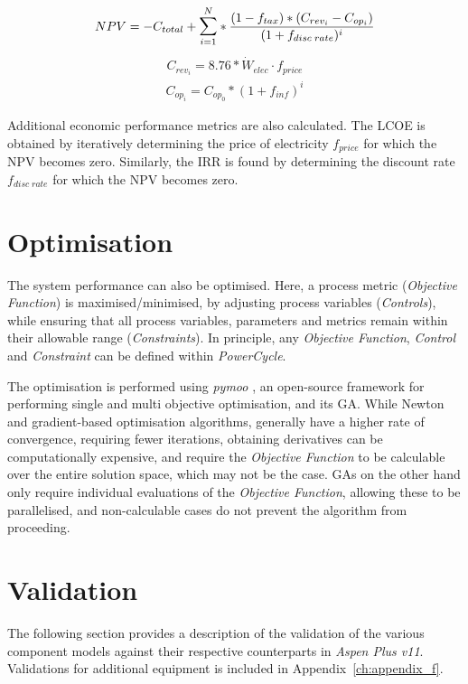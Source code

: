     \begin{align}
        NPV = - C_{total} + \mathlarger{\sum}_{i=1}^N *\frac{(1-f_{tax})*(C_{rev_i} - C_{op_i})}{(1+f_{disc\;rate})^i}\label{eq:economics_NPV}
    \end{align}
    \begin{align}
        C_{rev_i} =  8.76*\Dot W_{elec}\cdot f_{price} \label{eq:economics_revenue}
    \end{align}
    \begin{align}
        C_{op_i} = C_{op_0} *(1+f_{inf})^i \label{eq:economics_opcosts}
    \end{align}

    Additional economic performance metrics are also calculated. The \ac{LCOE} is obtained by iteratively determining the price of electricity \(f_{price}\) for which the \ac{NPV} becomes zero. Similarly, the \ac{IRR} is found by determining the discount rate \(f_{disc\;rate}\) for which the \ac{NPV} becomes zero.

\section{Optimisation}
    The system performance can also be optimised. Here, a process metric (\emph{Objective Function}) is maximised/minimised, by adjusting process variables (\emph{Controls}), while ensuring that all process variables, parameters and metrics remain within their allowable range (\emph{Constraints}). In principle, any \emph{Objective Function}, \emph{Control} and \emph{Constraint} can be defined within \emph{PowerCycle}. 
    
    The optimisation is performed using \emph{pymoo} \cite{Blank2020}, an open-source framework for performing single and multi objective optimisation, and its \ac{GA}. While Newton and gradient-based optimisation algorithms, generally have a higher rate of convergence, requiring fewer iterations, obtaining derivatives can be computationally expensive, and require the \emph{Objective Function} to be calculable over the entire solution space, which may not be the case. \ac{GA}s on the other hand only require individual evaluations of the \emph{Objective Function}, allowing these to be parallelised, and non-calculable cases do not prevent the algorithm from proceeding.

\section{Validation}
    The following section provides a description of the validation of the various component models against their respective counterparts in \emph{Aspen Plus v11}. Validations for additional equipment is included in Appendix~\ref{ch:appendix_f}. 

